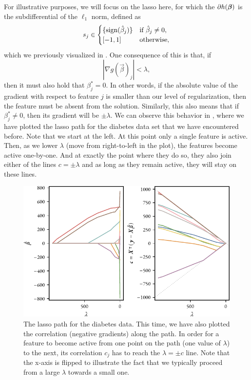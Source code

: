 For illustrative purposes, we will focus on the lasso here, for which the \(\partial h(\boldsymbol{\beta})\) is the subdifferential of the \(\ell_1\) norm, defined as
\[
  s_j \in
  \begin{cases}
    \{\operatorname{sign}(\hat\beta_j)\} & \text{if } \hat\beta_j \neq 0, \\
    [-1, 1]                & \text{otherwise},
  \end{cases}
\]
which we previously visualized in .
One consequence of this is that, if
\begin{equation*}
  |\nabla g(\vec{\beta})_j| < \lambda,
\end{equation*}
then it must also hold that \(\beta_j^* = 0\). In other words, if the absolute value of the gradient with respect to feature \(j\) is smaller than our level of regularization, then the feature must be absent from the solution. Similarly, this also means that if \(\beta_j^* \neq 0\), then its gradient will be \(\pm \lambda\). We can observe this behavior in , where we have plotted the lasso path for the diabetes data set that we have encountered before. Note that we start at the left. At this point only a single feature is active. Then, as we lower \(\lambda\) (move from right-to-left in the plot), the features become active one-by-one. And at exactly the point where they do so, they also join either of the lines \(c = \pm \lambda\) and as long as they remain active, they will stay on these lines.

\begin{figure}[htpb]
  \centering
  \includegraphics[]{figures/cor-coef-lasso-path.pdf}
  \caption{%
    The lasso path for the diabetes data. This time, we have also plotted the correlation (negative gradients) along the path. In order for a feature to become active from one point on the path (one value of \(\lambda\)) to the next, its correlation \(c_j\) has to reach the \(\lambda = \pm c\) line. Note that the x-axis is flipped to illustrate the fact that we typically proceed from a large \(\lambda\) towards a small one.
  }
  \label{fig:cor-coef-lasso-path}
\end{figure}

